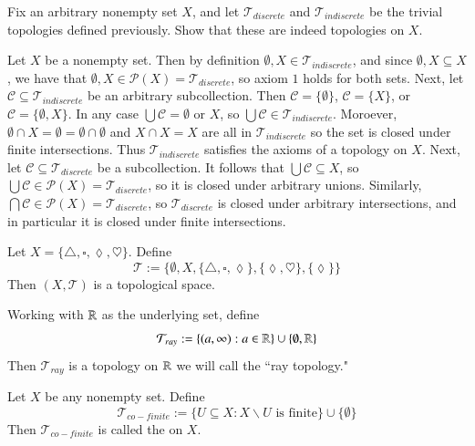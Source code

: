 \documentclass[12pt, a4paper, oneside, openright, titlepage]{book}
\begin{document}
\begin{exercise}
    Fix an arbitrary nonempty set $X$, and let $\mathcal{T}_{discrete}$ and $\mathcal{T}_{indiscrete}$ be the trivial topologies defined previously. Show that these are indeed topologies on $X$.
\end{exercise}
\begin{remark}[Solution]
    Let $X$ be a nonempty set. Then by definition $\emptyset, X \in \mathcal{T}_{indiscrete}$, and since $\emptyset,X \subseteq X$, we have that $\emptyset, X \in \mathcal{P}(X) = \mathcal{T}_{discrete}$, so axiom $1$ holds for both sets. Next, let $\mathcal{C} \subseteq \mathcal{T}_{indiscrete}$ be an arbitrary subcollection. Then $\mathcal{C} = \{\emptyset\}$, $\mathcal{C} = \{X\}$, or $\mathcal{C} = \{\emptyset, X\}$. In any case $\bigcup\mathcal{C} = \emptyset$ or $X$, so $\bigcup\mathcal{C} \in \mathcal{T}_{indiscrete}$. Moroever, $\emptyset\cap X = \emptyset = \emptyset \cap \emptyset$ and $X\cap X = X$ are all in $\mathcal{T}_{indiscrete}$ so the set is closed under finite intersections. Thus $\mathcal{T}_{indiscrete}$ satisfies the axioms of a topology on $X$. Next, let $\mathcal{C} \subseteq \mathcal{T}_{discrete}$ be a subcollection. It follows that $\bigcup\mathcal{C} \subseteq X$, so $\bigcup\mathcal{C} \in \mathcal{P}(X) = \mathcal{T}_{discrete}$, so it is closed under arbitrary unions. Similarly, $\bigcap\mathcal{C} \in \mathcal{P}(X) = \mathcal{T}_{discrete}$, so $\mathcal{T}_{discrete}$ is closed under arbitrary intersections, and in particular it is closed under finite intersections.
\end{remark}

\begin{example}
    Let $X = \{\triangle, \square, \lozenge,\heartsuit\}$. Define $$\mathcal{T}:=\{\emptyset, X, \{\triangle, \square, \lozenge\}, \{\lozenge,\heartsuit\},\{\lozenge\}\}$$
    Then $(X,\mathcal{T})$ is a topological space.
\end{example}

\begin{example}
    Working with $\mathbb R$ as the underlying set, define \begin{equation*}
        \mathcal{T}_{ray} :=\{(a,\infty):a\in \mathbb R\}\cup\{\emptyset,\mathbb R\}
    \end{equation*}
    Then $\mathcal{T}_{ray}$ is a topology on $\mathbb R$ we will call the ``ray topology."
\end{example}

\begin{example}
    Let $X$ be any nonempty set. Define \begin{equation*}
        \mathcal{T}_{co-finite} := \{U \subseteq X:X\backslash U\text{ is finite}\}\cup\{\emptyset\}
    \end{equation*}
    Then $\mathcal{T}_{co-finite}$ is called the  on $X$.
\end{example}
\end{document}
